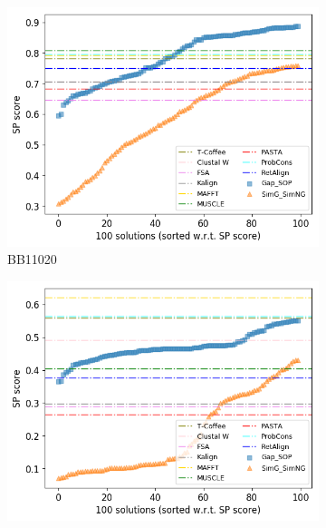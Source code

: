 \begin{figure}[!htbp]
\begin{adjustwidth}{-1cm}{-1cm}
		\begin{subfigure}{0.22\textwidth}
			\includegraphics[width=\columnwidth]{Figure/summary/precomputedInit/Balibase/BB11020_pairs_density_single_run_2}
			\caption{BB11020}
		\end{subfigure}
		\begin{subfigure}{0.22\textwidth}
			\includegraphics[width=\columnwidth]{Figure/summary/precomputedInit/Balibase/BB11033_pairs_density_single_run_2}

\end{subfigure}
\end{adjustwidth}
\end{figure}
